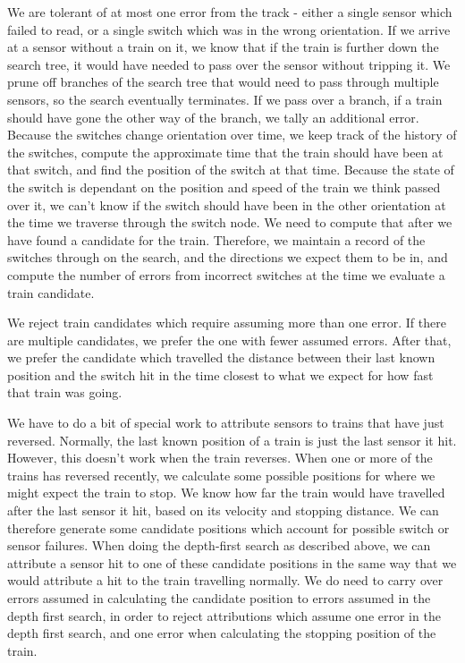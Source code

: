 \documentclass{article}
\begin{document}
We are tolerant of at most one error from the track - either a single sensor which failed to read, or a single switch which
was in the wrong orientation.
If we arrive at a sensor without a train on it, we know that if the train is further down the search tree, it
would have needed to pass over the sensor without tripping it.
We prune off branches of the search tree that would need to pass through multiple sensors, so the search eventually terminates.
If we pass over a branch, if a train should have gone the other way of the branch, we tally an additional error.
Because the switches change orientation over time, we keep track of the history of the switches, compute the approximate
time that the train should have been at that switch, and find the position of the switch at that time.
Because the state of the switch is dependant on the position and speed of the train we think passed over it, we can't know
if the switch should have been in the other orientation at the time we traverse through the switch node.
We need to compute that after we have found a candidate for the train.
Therefore, we maintain a record of the switches through on the search, and the directions we expect them to be in,
and compute the number of errors from incorrect switches at the time we evaluate a train candidate.

We reject train candidates which require assuming more than one error.
If there are multiple candidates, we prefer the one with fewer assumed errors.
After that, we prefer the candidate which travelled the distance between their last known position and the switch hit
in the time closest to what we expect for how fast that train was going.

We have to do a bit of special work to attribute sensors to trains that have just reversed.
Normally, the last known position of a train is just the last sensor it hit.
However, this doesn't work when the train reverses.
When one or more of the trains has reversed recently, we calculate some possible positions for where
we might expect the train to stop.
We know how far the train would have travelled after the last sensor it hit, based on its velocity and stopping
distance.
We can therefore generate some candidate positions which account for possible switch or sensor failures.
When doing the depth-first search as described above, we can attribute a sensor hit to one of these
candidate positions in the same way that we would attribute a hit to the train travelling normally.
We do need to carry over errors assumed in calculating the candidate position to errors assumed in
the depth first search, in order to reject attributions which assume one error in the depth first search,
and one error when calculating the stopping position of the train.
\end{document}
